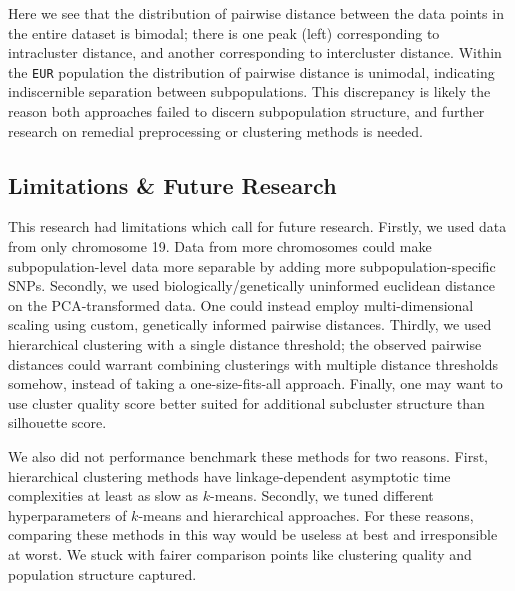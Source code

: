 \documentclass[11pt]{article}
\newcommand{\code}[1]{\texttt{#1}}
\theoremstyle{definition}
\begin{document}
\noindent Here we see that the distribution of pairwise distance between the data points in the entire dataset is bimodal; there is one peak (left) corresponding to intracluster distance, and another corresponding to intercluster distance. Within the \code{EUR} population the distribution of pairwise distance is unimodal, indicating indiscernible separation between subpopulations. This discrepancy is likely the reason both approaches failed to discern subpopulation structure, and further research on remedial preprocessing or clustering methods is needed.

\subsection{Limitations \& Future Research}\label{subsec:future}
\noindent This research had limitations which call for future research. Firstly, we used data from only chromosome 19. Data from more chromosomes could make subpopulation-level data more separable by adding more subpopulation-specific SNPs. Secondly, we used biologically/genetically uninformed euclidean distance on the PCA-transformed data. One could instead employ multi-dimensional scaling using custom, genetically informed pairwise distances. Thirdly, we used hierarchical clustering with a single distance threshold; the observed pairwise distances could warrant combining clusterings with multiple distance thresholds somehow, instead of taking a one-size-fits-all approach. Finally, one may want to use cluster quality score better suited for additional subcluster structure than silhouette score.

\noindent We also did not performance benchmark these methods for two reasons. First, hierarchical clustering methods have linkage-dependent asymptotic time complexities at least as slow as $k$-means. Secondly, we tuned different hyperparameters of $k$-means and hierarchical approaches. For these reasons, comparing these methods in this way would be useless at best and irresponsible at worst. We stuck with fairer comparison points like clustering quality and population structure captured.

\newpage


\end{document}
